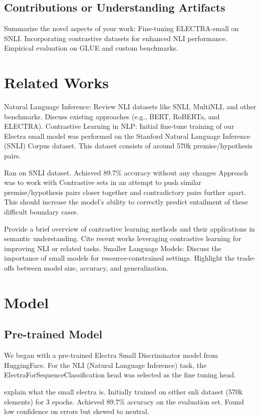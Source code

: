 \documentclass[11pt]{article}
\begin{document}
\subsection{Contributions or Understanding Artifacts}
Summarize the novel aspects of your work:
Fine-tuning ELECTRA-small on SNLI.
Incorporating contrastive datasets for enhanced NLI performance.
Empirical evaluation on GLUE and custom benchmarks.
\section{Related Works}
Natural Language Inference:
Review NLI datasets like SNLI, MultiNLI, and other benchmarks.
Discuss existing approaches (e.g., BERT, RoBERTa, and ELECTRA).
Contrastive Learning in NLP:
Initial fine-tune training of our Electra small model was performed on the Stanford Natural Language Inference (SNLI) Corpus dataset. This dataset consists of around 570k premise/hypothesis pairs. \citep{snlicorpus}

Ran on SNLI dataset. Achieved 89.7\% accuracy without any changes
Approach was to work with Contrastive sets in an attempt to push similar premise/hypothesis pairs closer together and contradictory pairs further apart. This should increase the model's ability to correctly predict entailment of these difficult boundary cases.

Provide a brief overview of contrastive learning methods and their applications in semantic understanding.
Cite recent works leveraging contrastive learning for improving NLI or related tasks.
Smaller Language Models:
Discuss the importance of small models for resource-constrained settings.
Highlight the trade-offs between model size, accuracy, and generalization.

\section{Model}
\subsection{Pre-trained Model}

We began with a pre-trained Electra Small Discriminator model from HuggingFace. For the NLI (Natural Language Inference) task, the ElectraForSequenceClassification head was selected as the fine tuning head. 

explain what the small electra is.
Initially trained on either snli dataset (570k elements) for 3 epochs. Achieved 89.7\% accuracy on the evaluation set. Found low confidence on errors but skewed to neutral.
\end{document}
